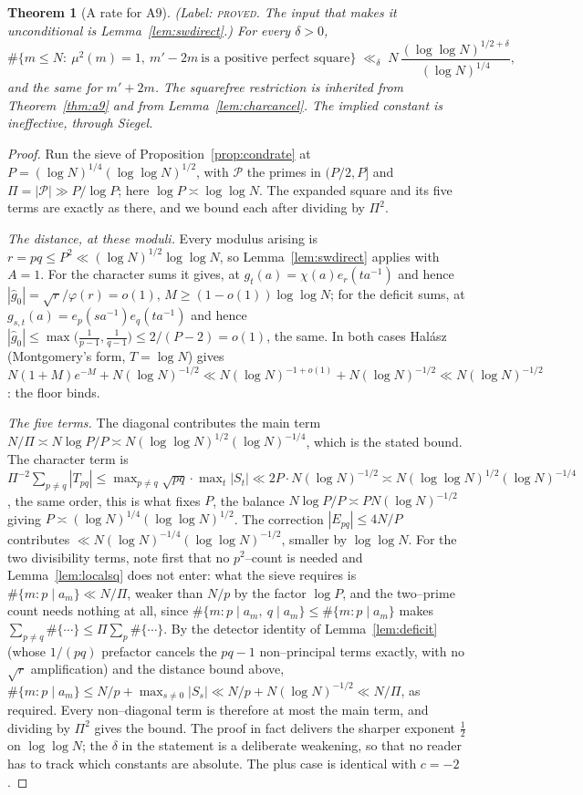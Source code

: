 \documentclass[11pt]{article}
\newtheorem{theorem}{Theorem}[section]
\theoremstyle{definition}
\begin{document}
\begin{theorem}[A rate for $\mathrm{A}9$]\label{cor:a9rate}
\textup{(Label: \textsc{proved}. The input that makes it unconditional is Lemma~\ref{lem:swdirect}.)}
For every $\delta>0$,
\[ \#\{m\le N:\ \mu^2(m)=1,\ m'-2m\ \text{is a positive perfect square}\}
    \;\ll_\delta\;N\,\frac{(\log\log N)^{1/2+\delta}}{(\log N)^{1/4}}, \]
and the same for $m'+2m$. The squarefree restriction is inherited from Theorem~\ref{thm:a9} and from Lemma~\ref{lem:charcancel}. The implied constant is
ineffective, through Siegel.
\end{theorem}
\begin{proof}
Run the sieve of Proposition~\ref{prop:condrate} at
$P=(\log N)^{1/4}(\log\log N)^{1/2}$, with $\mathcal P$ the primes in $(P/2,P]$ and
$\Pi=|\mathcal P|\gg P/\log P$; here $\log P\asymp\log\log N$. The expanded square and its five
terms are exactly as there, and we bound each after dividing by $\Pi^2$.

\emph{The distance, at these moduli.} Every modulus arising is $r=pq\le P^2\ll(\log N)^{1/2}\log\log N$,
so Lemma~\ref{lem:swdirect} applies with $A=1$. For the character sums it gives, at
$g_t(a)=\chi(a)e_r(ta^{-1})$ and hence $|\widehat g_0|=\sqrt r/\varphi(r)=o(1)$,
$M\ge(1-o(1))\log\log N$; for the deficit sums, at $g_{s,t}(a)=e_p(sa^{-1})e_q(ta^{-1})$ and hence
$|\widehat g_0|\le\max\bigl(\tfrac1{p-1},\tfrac1{q-1}\bigr)\le2/(P-2)=o(1)$, the same. In both cases
Hal\'asz (Montgomery's form, $T=\log N$) gives
$N(1+M)e^{-M}+N(\log N)^{-1/2}\ll N(\log N)^{-1+o(1)}+N(\log N)^{-1/2}\ll N(\log N)^{-1/2}$: the
floor binds.

\emph{The five terms.} The diagonal contributes the main term $N/\Pi\asymp N\log P/P\asymp
N(\log\log N)^{1/2}(\log N)^{-1/4}$, which is the stated bound. The character term is
$\Pi^{-2}\sum_{p\ne q}|T_{pq}|\le\max_{p\ne q}\sqrt{pq}\cdot\max_t|S_t|\ll 2P\cdot N(\log N)^{-1/2}
\asymp N(\log\log N)^{1/2}(\log N)^{-1/4}$, the same order, this is what fixes $P$, the balance
$N\log P/P\asymp PN(\log N)^{-1/2}$ giving $P\asymp(\log N)^{1/4}(\log\log N)^{1/2}$. The correction
$|E_{pq}|\le4N/P$ contributes $\ll N(\log N)^{-1/4}(\log\log N)^{-1/2}$, smaller by $\log\log N$. For
the two divisibility terms, note first that no $p^2$--count is needed and Lemma~\ref{lem:localsq}
does not enter: what the sieve requires is $\#\{m:p\mid a_m\}\ll N/\Pi$, weaker than $N/p$ by the
factor $\log P$, and the two--prime count needs nothing at all, since
$\#\{m:p\mid a_m,\ q\mid a_m\}\le\#\{m:p\mid a_m\}$ makes
$\sum_{p\ne q}\#\{\cdots\}\le\Pi\sum_p\#\{\cdots\}$. By the detector identity of
Lemma~\ref{lem:deficit} (whose $1/(pq)$ prefactor cancels the $pq-1$ non--principal terms exactly,
with no $\sqrt r$ amplification) and the distance bound above,
$\#\{m:p\mid a_m\}\le N/p+\max_{s\ne0}|S_s|\ll N/p+N(\log N)^{-1/2}\ll N/\Pi$, as required. Every
non--diagonal term is therefore at most the main term, and dividing by $\Pi^2$ gives the bound.
The proof in fact delivers the sharper exponent $\tfrac12$ on $\log\log N$; the $\delta$ in the
statement is a deliberate weakening, so that no reader has to track which constants are absolute.
The plus case is identical with $c=-2$.
\end{proof}
\end{document}
